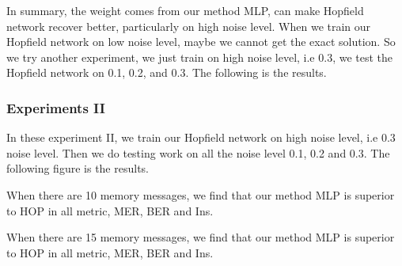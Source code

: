 In summary, the weight comes from our method MLP, can make Hopfield network recover better, particularly on high noise level. When we train our Hopfield network on low noise level, maybe we cannot get the exact solution. So we try another experiment, we just train on high noise level, i.e 0.3, we test the Hopfield network on 0.1, 0.2, and 0.3. The following is the results.

\subsubsection{Experiments II} 

In these experiment II, we train our Hopfield network on high noise level, i.e 0.3 noise level. Then we do testing work on all the noise level 0.1, 0.2 and 0.3. The following figure is the results.

When there are 10 memory messages, we find that our method MLP is superior to HOP in all metric, MER, BER and Ins.

When there are 15 memory messages, we find that our method MLP is superior to HOP in all metric, MER, BER and Ins.


